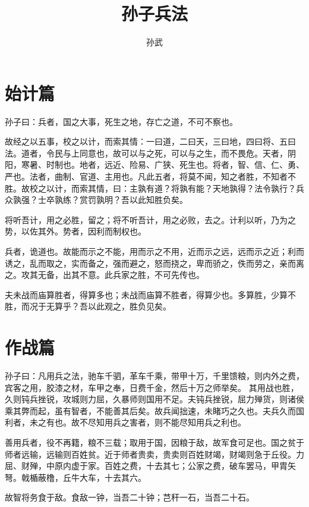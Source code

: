\documentclass[UTF8]{ctexart}
\title{孙子兵法}
\author{孙武}
\date{}
\begin{document}
	
	\maketitle
	\thispagestyle{empty}
	
	\newpage
	\tableofcontents
	
	\newpage
	\setcounter{page}{1}
	\section{始计篇}
	
	孙子曰：兵者，国之大事，死生之地，存亡之道，不可不察也。
	
	故经之以五事，校之以计，而索其情：一曰道，二曰天，三曰地，四曰将、五曰法。道者，令民与上同意也，故可以与之死，可以与之生，而不畏危。天者，阴阳，寒暑、时制也。地者，远近、险易、广狭、死生也。将者，智、信、仁、勇、严也。法者，曲制、官道、主用也。凡此五者，将莫不闻，知之者胜，不知者不胜。故校之以计，而索其情，曰：主孰有道？将孰有能？天地孰得？法令孰行？兵众孰强？士卒孰练？赏罚孰明？吾以此知胜负矣。
	
	将听吾计，用之必胜，留之；将不听吾计，用之必败，去之。计利以听，乃为之势，以佐其外。势者，因利而制权也。
	
	兵者，诡道也。故能而示之不能，用而示之不用，近而示之远，远而示之近；利而诱之，乱而取之，实而备之，强而避之，怒而挠之，卑而骄之，佚而劳之，亲而离之。攻其无备，出其不意。此兵家之胜，不可先传也。
	
	夫未战而庙算胜者，得算多也；未战而庙算不胜者，得算少也。多算胜，少算不胜，而况于无算乎？吾以此观之，胜负见矣。
	
	\newpage
	\section{作战篇}
	
	孙子曰：凡用兵之法，驰车千驷，革车千乘，带甲十万，千里馈粮，则内外之费，宾客之用，胶漆之材，车甲之奉，日费千金，然后十万之师举矣。
	其用战也胜，久则钝兵挫锐，攻城则力屈，久暴师则国用不足。夫钝兵挫锐，屈力殚货，则诸侯乘其弊而起，虽有智者，不能善其后矣。故兵闻拙速，未睹巧之久也。夫兵久而国利者，未之有也。故不尽知用兵之害者，则不能尽知用兵之利也。
	
	善用兵者，役不再籍，粮不三载；取用于国，因粮于敌，故军食可足也。国之贫于师者远输，远输则百姓贫。近于师者贵卖，贵卖则百姓财竭，财竭则急于丘役。力屈、财殚，中原内虚于家。百姓之费，十去其七；公家之费，破车罢马，甲胄矢弩。戟楯蔽橹，丘牛大车，十去其六。
	
	故智将务食于敌。食敌一钟，当吾二十钟；芑秆一石，当吾二十石。
	
\end{document}
